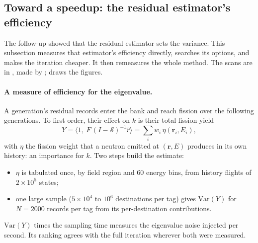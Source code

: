\subsection{Toward a speedup: the residual estimator's efficiency}\label{sec:res:speedup}

The follow-up showed that the residual estimator sets the variance. This subsection measures that
estimator's efficiency directly, searches its options, and makes the iteration cheaper. It then
remeasures the whole method. The scans are in , made by
;  draws the figures.

\paragraph{A measure of efficiency for the eigenvalue.} A generation's residual records enter the bank
and reach fission over the following generations. To first order, their effect on $k$ is their total
fission yield
\begin{equation}
Y=\big\langle 1,\;F\,(I-\mathcal S)^{-1}\hat r\big\rangle=\sum_i w_i\,\eta(\mathbf r_i,E_i),
\end{equation}
with $\eta$ the fission weight that a neutron emitted at $(\mathbf r,E)$ produces in its own
history: an importance for $k$. Two steps build the estimate:
\begin{itemize}
\item $\eta$ is tabulated once, by field region and 60 energy bins, from history flights of
  $2\times10^5$ states;
\item one large sample ($5\times10^4$ to $10^6$ destinations per tag) gives
  $\mathrm{Var}(Y)$ for $N=2000$ records per tag from its per-destination contributions.
\end{itemize}
$\mathrm{Var}(Y)$ times the sampling time measures the eigenvalue noise injected per second. Its
ranking agrees with the full iteration wherever both were measured.

